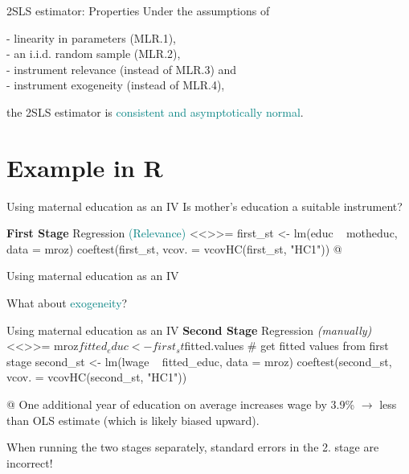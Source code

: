 \documentclass[11pt, aspectratio = 169]{beamer}
\begin{document}
\begin{frame}{2SLS estimator: Properties}
Under the assumptions of 

- linearity in parameters (MLR.1), \\
- an i.i.d. random sample (MLR.2),  \\
- instrument relevance (instead of MLR.3) and \\
- instrument exogeneity (instead of MLR.4), 

the 2SLS estimator is \textcolor{teal}{consistent and asymptotically normal}.
\end{frame}
\section{Example in R}


\begin{frame}[fragile]{Using maternal education as an IV}
Is mother's education a suitable instrument?

\pause

\textbf{First Stage} Regression \textcolor{teal}{(Relevance)}
\small
<<>>=
first_st <- lm(educ ~ motheduc, data = mroz)
coeftest(first_st, vcov. = vcovHC(first_st, "HC1"))   
@

\end{frame}

\begin{frame}[fragile]{Using maternal education as an IV}

What about  \textcolor{teal}{exogeneity}?

\end{frame}

\begin{frame}[fragile]{Using maternal education as an IV}
\textbf{Second Stage} Regression \textit{(manually)}
\small
<<>>=
mroz$fitted_educ <- first_st$fitted.values # get fitted values from first stage
second_st <- lm(lwage ~ fitted_educ, data = mroz)
coeftest(second_st, vcov. = vcovHC(second_st, "HC1"))  
  
@
\vspace{-0.29cm}
One additional year of education on average increases wage by 3.9\% $\rightarrow$  less than OLS estimate (which is likely biased upward). 

\normalsize
\alert{When running the two stages separately,  standard errors in the 2. stage are incorrect!}
\end{frame}
\end{document}
